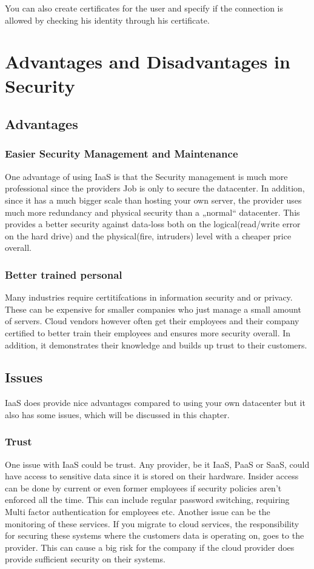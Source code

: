 You can also create certificates for the user and specify if the connection is allowed by checking his identity through his certificate. 
\cite{ssh_supp}

\section{Advantages and Disadvantages in Security}


\subsection{Advantages}
\subsubsection{Easier Security Management and Maintenance}
One advantage of using IaaS is that the Security management is much more professional since the providers Job is only to secure the datacenter.
In addition, since it has a much bigger scale than hosting your own server, the provider uses much more redundancy and physical security than a „normal“ datacenter. This provides a better security against data-loss both on the logical(read/write error on the hard drive) and the physical(fire, intruders) level with a cheaper price overall.
\cite{sonn_pre}

\subsubsection{Better trained personal}
Many industries require certitifcations in information security and or privacy. These can be expensive for smaller companies who just manage a small amount of servers. Cloud vendors however often get their employees and their company certified to better train their employees and ensures more security overall. In addition, it demonstrates their knowledge and builds up trust to their customers.

\subsection{Issues}
IaaS does provide nice advantages compared to using your own datacenter but it also has some issues, which will be discussed in this chapter.

\subsubsection{Trust}
One issue with IaaS could be trust. Any provider, be it IaaS, PaaS or SaaS, could have access to sensitive data since it is stored on their hardware. Insider access can be done by current or even former employees if security policies aren't enforced all the time. This can include regular password switching, requiring Multi factor authentication for employees etc.
Another issue can be the monitoring of these services. If you migrate to cloud services, the responsibility for securing these systems where the customers data is operating on, goes to the provider. This can cause a big risk for the company if the cloud provider does provide sufficient security on their systems.

